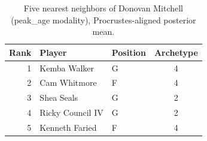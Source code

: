 \begin{table}[htbp]
  \centering\small
  \begin{tabular}{rllc}
    \toprule
    Rank & Player & Position & Archetype \\
    \midrule
    1 & Kemba Walker & G & 4 \\
    2 & Cam Whitmore & F & 4 \\
    3 & Shea Seals & G & 2 \\
    4 & Ricky Council IV & G & 2 \\
    5 & Kenneth Faried & F & 4 \\
    \bottomrule
  \end{tabular}
  \caption{Five nearest neighbors of Donovan Mitchell (peak_age modality), Procrustes-aligned posterior mean.}
  \label{tab:Donovan_Mitchell_neighbors_peak_age}
\end{table}


